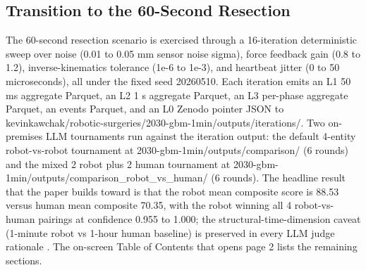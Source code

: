 \subsection{Transition to the 60-Second Resection}
\label{sec:intro-transition}

The 60-second resection scenario is exercised through a 16-iteration
deterministic sweep over noise (0.01 to 0.05 mm sensor noise sigma),
force feedback gain (0.8 to 1.2), inverse-kinematics tolerance
(1e-6 to 1e-3), and heartbeat jitter (0 to 50 microseconds), all
under the fixed seed 20260510. Each iteration emits an L1 50 ms
aggregate Parquet, an L2 1 s aggregate Parquet, an L3 per-phase
aggregate Parquet, an events Parquet, and an L0 Zenodo pointer JSON
to kevinkawchak/robotic-surgeries/2030-gbm-1min/outputs/iterations/.
Two on-premises LLM tournaments run against the iteration output:
the default 4-entity robot-vs-robot tournament at
2030-gbm-1min/outputs/comparison/ (6 rounds) and the mixed 2 robot
plus 2 human tournament at
2030-gbm-1min/outputs/comparison_robot_vs_human/ (6 rounds). The
headline result that the paper builds toward is that the robot mean
composite score is 88.53 versus human mean composite 70.35, with the
robot winning all 4 robot-vs-human pairings at confidence 0.955 to
1.000; the structural-time-dimension caveat (1-minute robot vs
1-hour human baseline) is preserved in every LLM judge rationale
\cite{kawchak_2026_20113157, repo-robotic-surgeries}. The on-screen
Table of Contents that opens page 2 lists the remaining sections.
